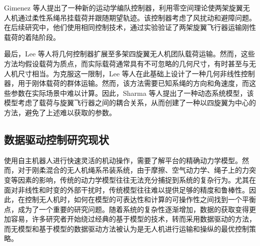 \documentclass[lang=chs, degree=master, blindreview=false, winfonts=true]{yanputhesis}
\begin{document}
Gimenez 等人提出了一种新的运动学编队控制器，利用零空间理论使两架旋翼无人机通过柔性系绳吊挂载荷并跟随期望轨迹\cite{gimenez2018multi}。该控制器考虑了风扰动和避障问题。在后续研究中，他们使用相同控制技术，通过实验验证了两架旋翼飞行器运输刚性载荷的着陆阶段\cite{gimenez2020control}。

最后，Lee 等人将几何控制器扩展至多架四旋翼无人机团队载荷运输\cite{lee2013geometric}。然而，这些方法均假设载荷为质点，而实际载荷通常具有不可忽略的几何尺寸，有时甚至与无人机尺寸相当。为克服这一限制，Lee 等人在此基础上设计了一种几何非线性控制器，用于刚体载荷的群体运输\cite{lee2017geometric}。然而，该方法需要已知系绳的方向和角速度，而这些参数在实际场景中难以计算。因此，Sharma 等人提出了一种动态系统模型，该模型考虑了载荷与旋翼飞行器之间的耦合关系，从而创建了一种以四旋翼为中心的方法，避免了上述难以获取的参数\cite{sharma2023geometric}。





\subsection{数据驱动控制研究现状}

使用自主机器人进行快速灵活的机动操作，需要了解平台的精确动力学模型。然而，对于刚柔混合的无人机绳系吊装系统，由于摩擦、空气动力学、绳子上的力突变等因素的影响，传统的动力学模型往往无法充分捕捉到系统的复杂行为。尤其在面对非线性和时变的外部干扰时，传统模型往往难以提供足够的精度和鲁棒性。因此，在控制无人机时，如何在模型的可表达性和计算的可操作性之间找到一个平衡点，成为了一个重要的研究问题。随着系统的复杂性逐渐增加，数据的获取变得更加容易，许多研究者开始绕过经典的基于模型的技术，转而采用数据驱动的方法\cite{hou2013model}，而无模型和基于模型的数据驱动方法被认为是无人机进行运输和操纵的最优控制策略。
\end{document}
